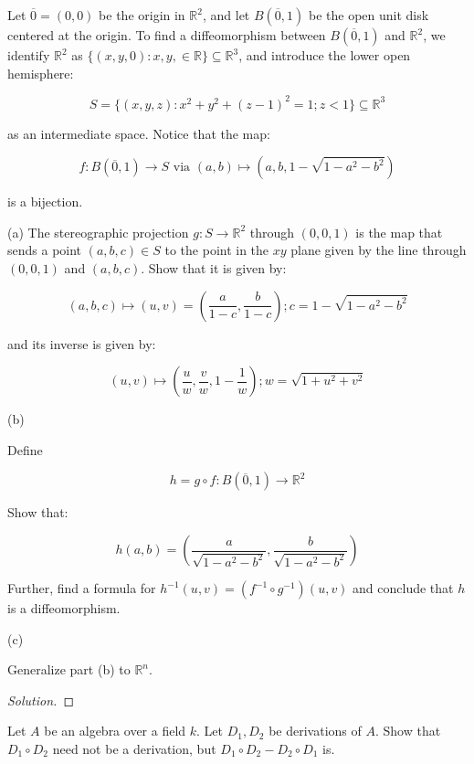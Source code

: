 \documentclass[10pt]{article}
\newenvironment{problem}[2][]{\begin{trivlist}
\item[\hskip \labelsep {\bfseries #1}\hskip \labelsep {\bfseries #2.}]}{\end{trivlist}}
\begin{document}
\begin{problem}{Question 2}

Let $\overline{0} = (0,0)$ be the origin in $\mathbb{R}^2$, and let $B(\overline{0},1)$ be the open unit disk centered at the origin. To find a diffeomorphism between $B(\overline{0},1)$ and $\mathbb{R}^2$, we identify $\mathbb{R}^2$ as $\{ (x,y,0) : x,y, \in \mathbb{R} \} \subseteq \mathbb{R}^3$, and introduce the lower open hemisphere:

$$ S = \{ (x,y,z) : x^2 + y^2 + (z-1)^2 = 1; z < 1 \} \subseteq \mathbb{R}^3 $$

as an intermediate space. Notice that the map:

$$f: B(\overline{0},1) \to S \text{ via } (a,b) \mapsto (a,b,1 - \sqrt{1 - a^2 - b^2}) $$

is a bijection.

(a) The stereographic projection $g: S \to \mathbb{R}^2$ through $(0,0,1)$ is the map that sends a point $(a,b,c) \in S$ to the point in the $xy$ plane given by the line through $(0,0,1)$ and $(a,b,c)$. Show that it is given by:

$$(a,b,c) \mapsto (u,v) = \left( \frac{a}{1-c}, \frac{b}{1-c} \right); c =1 - \sqrt{1 - a^2 -b^2} $$

and its inverse is given by:

$$(u,v) \mapsto \left( \frac{u}{w}, \frac{v}{w}, 1 - \frac{1}{w} \right); w = \sqrt{1 + u^2 + v^2} $$

(b) 

Define

$$h = g \circ f :  B(\overline{0},1) \to \mathbb{R}^2$$

Show that:

$$h(a,b) = \left( \frac{a}{\sqrt{1 - a^2 - b^2}}, \frac{b}{\sqrt{1 - a^2 - b^2}} \right)$$

Further, find a formula for $h^{-1}(u,v) = (f^{-1} \circ g^{-1})(u,v)$ and conclude that $h$ is a diffeomorphism. 

(c)

Generalize part (b) to $\mathbb{R}^n$.

\end{problem}

\begin{proof}[Solution]


\end{proof}

\begin{problem}{Question 3}

Let $A$ be an algebra over a field $k$. Let $D_1, D_2$ be derivations of $A$. Show that $D_1 \circ D_2$ need not be a derivation, but $D_1 \circ D_2 - D_2 \circ D_1$ is.

\end{problem}
\end{document}
